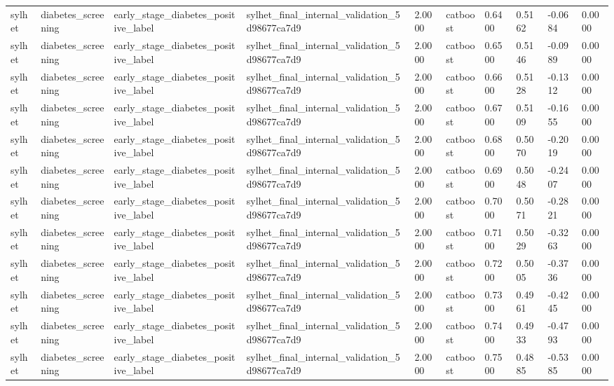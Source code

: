 \begin{tabular}{llllllllll}
sylhet & diabetes\_screening & early\_stage\_diabetes\_positive\_label & sylhet\_final\_internal\_validation\_5d98677ca7d9 & 2.0000 & catboost & 0.6400 & 0.5162 & -0.0684 & 0.0000 \\
sylhet & diabetes\_screening & early\_stage\_diabetes\_positive\_label & sylhet\_final\_internal\_validation\_5d98677ca7d9 & 2.0000 & catboost & 0.6500 & 0.5146 & -0.0989 & 0.0000 \\
sylhet & diabetes\_screening & early\_stage\_diabetes\_positive\_label & sylhet\_final\_internal\_validation\_5d98677ca7d9 & 2.0000 & catboost & 0.6600 & 0.5128 & -0.1312 & 0.0000 \\
sylhet & diabetes\_screening & early\_stage\_diabetes\_positive\_label & sylhet\_final\_internal\_validation\_5d98677ca7d9 & 2.0000 & catboost & 0.6700 & 0.5109 & -0.1655 & 0.0000 \\
sylhet & diabetes\_screening & early\_stage\_diabetes\_positive\_label & sylhet\_final\_internal\_validation\_5d98677ca7d9 & 2.0000 & catboost & 0.6800 & 0.5070 & -0.2019 & 0.0000 \\
sylhet & diabetes\_screening & early\_stage\_diabetes\_positive\_label & sylhet\_final\_internal\_validation\_5d98677ca7d9 & 2.0000 & catboost & 0.6900 & 0.5048 & -0.2407 & 0.0000 \\
sylhet & diabetes\_screening & early\_stage\_diabetes\_positive\_label & sylhet\_final\_internal\_validation\_5d98677ca7d9 & 2.0000 & catboost & 0.7000 & 0.5071 & -0.2821 & 0.0000 \\
sylhet & diabetes\_screening & early\_stage\_diabetes\_positive\_label & sylhet\_final\_internal\_validation\_5d98677ca7d9 & 2.0000 & catboost & 0.7100 & 0.5029 & -0.3263 & 0.0000 \\
sylhet & diabetes\_screening & early\_stage\_diabetes\_positive\_label & sylhet\_final\_internal\_validation\_5d98677ca7d9 & 2.0000 & catboost & 0.7200 & 0.5005 & -0.3736 & 0.0000 \\
sylhet & diabetes\_screening & early\_stage\_diabetes\_positive\_label & sylhet\_final\_internal\_validation\_5d98677ca7d9 & 2.0000 & catboost & 0.7300 & 0.4961 & -0.4245 & 0.0000 \\
sylhet & diabetes\_screening & early\_stage\_diabetes\_positive\_label & sylhet\_final\_internal\_validation\_5d98677ca7d9 & 2.0000 & catboost & 0.7400 & 0.4933 & -0.4793 & 0.0000 \\
sylhet & diabetes\_screening & early\_stage\_diabetes\_positive\_label & sylhet\_final\_internal\_validation\_5d98677ca7d9 & 2.0000 & catboost & 0.7500 & 0.4885 & -0.5385 & 0.0000 \\

\end{tabular}
